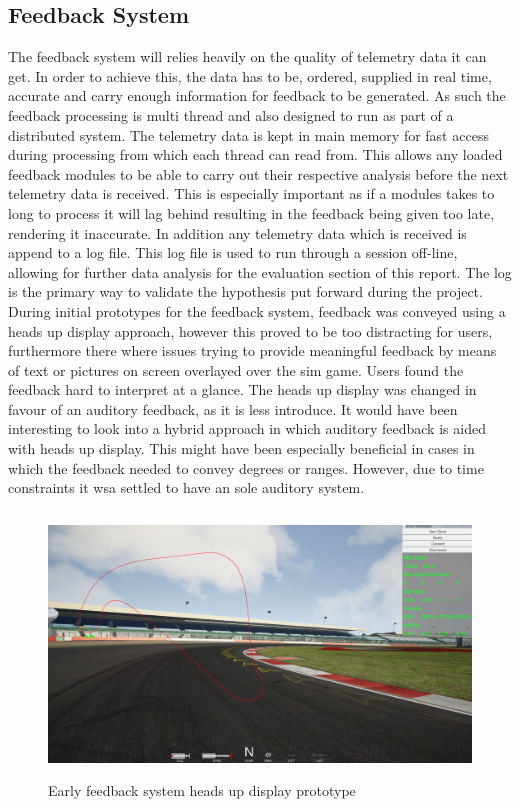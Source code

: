 \subsection{Feedback System}
	The feedback system will relies heavily on the quality of telemetry data it can get. In order to achieve this, the data has to be, ordered, supplied in real time, accurate and carry enough information for feedback to be generated. As such the feedback processing is multi thread and also designed to run as part of a distributed system. The telemetry data is kept in main memory for fast access during processing from which each thread can read from. This allows any loaded feedback modules to be able to carry out their respective analysis before the next telemetry data is received. This is especially important as if a modules takes to long to process it will lag behind resulting in the feedback being given too late, rendering it inaccurate. In addition any telemetry data which is received is append to a log file. This log file is used to run through a session off-line, allowing for further data analysis for the evaluation section of this report. The log is the primary way to validate the hypothesis put forward during the project.
	During initial prototypes for the feedback system, feedback was conveyed using a heads up display approach, however this proved to be too distracting for users, furthermore there where issues trying to provide meaningful feedback by means of text or pictures on screen overlayed over the sim game. Users found the feedback hard to interpret at a glance. The heads up display was changed in favour of an auditory feedback, as it is less introduce\cite{leahy2003auditory}. It would have been interesting to look into a hybrid approach in which auditory feedback is aided with heads up display. This might have been especially beneficial in cases in which the feedback needed to convey degrees or ranges. However, due to time constraints it wsa settled to have an sole auditory system. 

\begin{figure}[!htb]
	\centering
	\includegraphics[height=7cm]{images/uiPrototype}
	\caption{Early feedback system heads up display prototype}
	\label{fig:uiPrototype}
\end{figure}

